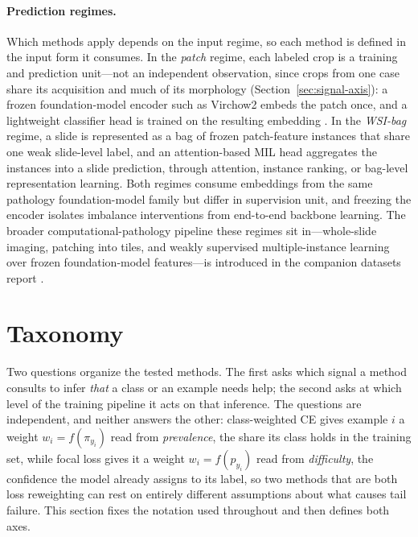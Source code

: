 \documentclass[11pt]{article}
\begin{document}
\paragraph{Prediction regimes.}
Which methods apply depends on the input regime, so each method is defined in the input form it consumes. In the \emph{patch} regime, each labeled crop is a training and prediction unit---not an independent observation, since crops from one case share its acquisition and much of its morphology (Section~\ref{sec:signal-axis}): a frozen foundation-model encoder such as Virchow2 embeds the patch once, and a lightweight classifier head is trained on the resulting embedding \citep{zimmermann2024virchow2,vorontsov2024virchow}. In the \emph{WSI-bag} regime, a slide is represented as a bag of frozen patch-feature instances that share one weak slide-level label, and an attention-based MIL head aggregates the instances into a slide prediction, through attention, instance ranking, or bag-level representation learning. Both regimes consume embeddings from the same pathology foundation-model family but differ in supervision unit, and freezing the encoder isolates imbalance interventions from end-to-end backbone learning. The broader computational-pathology pipeline these regimes sit in---whole-slide imaging, patching into tiles, and weakly supervised multiple-instance learning over frozen foundation-model features---is introduced in the companion datasets report \citep{queisler2026datasets}.

\section{Taxonomy}
\label{sec:taxonomy}
Two questions organize the tested methods. The first asks which signal a method consults to infer \emph{that} a class or an example needs help; the second asks at which level of the training pipeline it acts on that inference. The questions are independent, and neither answers the other: class-weighted CE gives example $i$ a weight $w_i=f(\pi_{y_i})$ read from \emph{prevalence}, the share its class holds in the training set, while focal loss gives it a weight $w_i=f(p_{y_i})$ read from \emph{difficulty}, the confidence the model already assigns to its label, so two methods that are both loss reweighting can rest on entirely different assumptions about what causes tail failure. This section fixes the notation used throughout and then defines both axes.
\end{document}
